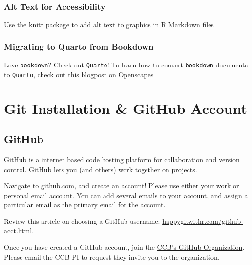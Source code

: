 \documentclass[
]{book}
\begin{document}
\hypertarget{alt-text-for-accessibility}{%
\subsection{Alt Text for Accessibility}\label{alt-text-for-accessibility}}

\href{https://www.rstudio.com/blog/knitr-fig-alt/}{Use the knitr package to add alt text to graphics in R Markdown files}

\hypertarget{migrating-to-quarto-from-bookdown}{%
\subsection{Migrating to Quarto from Bookdown}\label{migrating-to-quarto-from-bookdown}}

Love \texttt{bookdown}? Check out \texttt{Quarto}! To learn how to convert \texttt{bookdown} documents to \texttt{Quarto}, check out this blogpost on \href{https://www.openscapes.org/blog/2022/07/21/quarto-migrate/}{Openscapes}

\hypertarget{git}{%
\chapter{Git Installation \& GitHub Account}\label{git}}

\hypertarget{github}{%
\section{GitHub}\label{github}}

GitHub is a internet based code hosting platform for collaboration and \href{https://www.atlassian.com/git/tutorials/what-is-version-control\#:~:text=Version\%20control\%2C\%20also\%20known\%20as,to\%20source\%20code\%20over\%20time.}{version control}. GitHub lets you (and others) work together on projects.

Navigate to \href{https://github.com/}{github.com}, and create an account! Please use either your work or personal email account. You can add several emails to your account, and assign a particular email as the primary email for the account.

Review this article on choosing a GitHub username: \url{happygitwithr.com/github-acct.html}.

Once you have created a GitHub account, join the \href{https://github.com/ccbucr}{CCB's GitHub Organization}. Please email the CCB PI to request they invite you to the organization.
\end{document}
